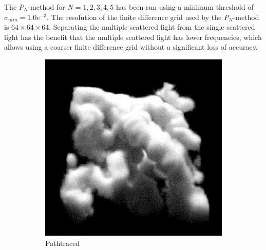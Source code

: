 The $P_N$-method for $N={1,2,3,4,5}$ has been run using a minimum threshold of $\sigma_{min}=1.0e^{-3}$. The resolution of the finite difference grid used by the $P_N$-method is $64\times 64\times 64$. Separating the multiple scattered light from the single scattered light has the benefit that the multiple scattered light has lower frequencies, which allows using a coarser finite difference grid without a significant loss of accuracy.
\begin{figure}[h]
\centering
\begin{subfigure}{0.49\columnwidth}
\includegraphics[width=\columnwidth]{04_pn_method/results/nebulae_ms_groundtruth.png}
\caption{Pathtraced}
\label{fig:pn_results_nebulae1_pathtraced}
\end{subfigure}%
\hspace{0.01\columnwidth}
\begin{subfigure}{0.49\columnwidth}

\end{subfigure}
\end{figure}
